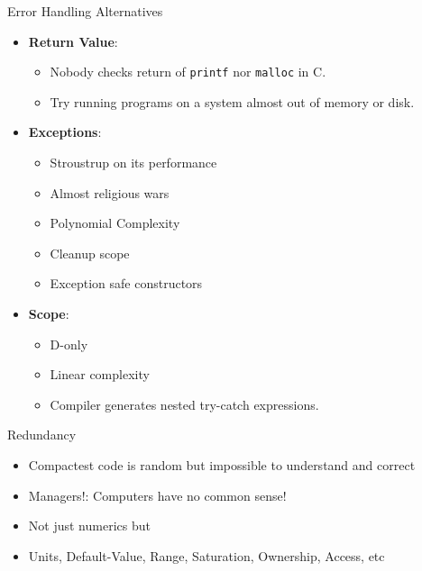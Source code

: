 \documentclass[xcolor=dvipsnames]{beamer}
\begin{document}
\begin{frame}[fragile]{Error Handling Alternatives}
  \begin{itemize}[<+->]
  \item \textbf{Return Value}:
    \begin{itemize}[<+->]
    \item Nobody checks return of \texttt{printf} nor \texttt{malloc} in C.
    \item Try running programs on a system almost out of memory or disk.
    \end{itemize}
  \item \textbf{Exceptions}:
    \begin{itemize}[<+->]
    \item Stroustrup on its performance
    \item Almost religious wars
    \item Polynomial Complexity
    \item Cleanup scope
    \item Exception safe constructors
    \end{itemize}
  \item \textbf{Scope}:
    \begin{itemize}[<+->]
    \item D-only
    \item Linear complexity
    \item Compiler generates nested try-catch expressions.
    \end{itemize}
  \end{itemize}
\end{frame}

\begin{frame}[fragile]{Redundancy}
  \begin{figure}
  \end{figure}
  \begin{itemize}[<+->]
  \item Compactest code is random but impossible to understand and correct
  \item Managers!: Computers have no common sense!
  \item Not just numerics but
  \item Units, Default-Value, Range, Saturation, Ownership, Access, etc
  \end{itemize}
\end{frame}
\end{document}
